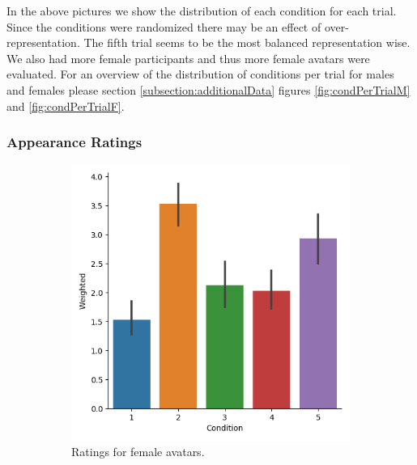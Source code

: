 In the above pictures we show the distribution of each condition for each trial. Since the conditions were randomized there may be an effect of over-representation. The fifth trial seems to be the most balanced representation wise.
We also had more female participants and thus more female avatars were evaluated. For an overview of the distribution of conditions per trial for males and females please section \ref{subsection:additionalData} figures \ref{fig:condPerTrialM} and \ref{fig:condPerTrialF}.

\subsubsection{Appearance Ratings}
\begin{figure}[H]
 \hspace*{\fill}
     \begin{subfigure}[b]{0.4\textwidth}
         \centering
         \includegraphics[width=\textwidth]{Files/Plots/weighted_ratings_female_experiment.png}
         \caption{Ratings for female avatars.}
         \label{fig:weightedFEx}
     \end{subfigure}
      \hspace*{\fill}
     \begin{subfigure}[b]{0.4\textwidth}
         \centering

\end{subfigure}
\end{figure}

